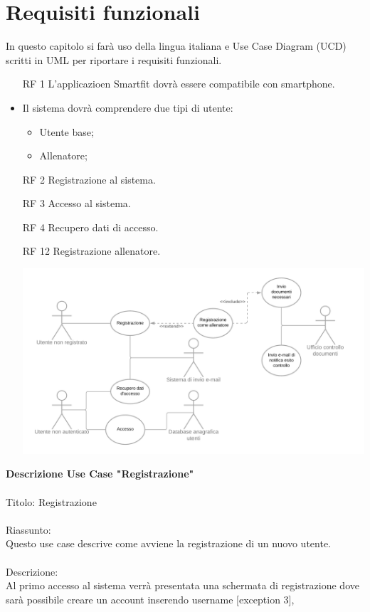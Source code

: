 \documentclass{article}
\begin{document}
\section{Requisiti funzionali}
In questo capitolo si farà uso della lingua italiana e Use Case Diagram (UCD) scritti in UML per riportare i requisiti funzionali.
\begin{itemize}
   \item[RF 1] L'applicazioen Smartfit dovrà essere compatibile con smartphone.
   \item Il sistema dovrà comprendere due tipi di utente:
   \begin{itemize}
      \item Utente base;
      \item Allenatore;
   \end{itemize}
   \item[RF 2] Registrazione al sistema.
   \item[RF 3] Accesso al sistema.
   \item[RF 4] Recupero dati di accesso.   
   \item[RF 12] Registrazione allenatore. 
   \begin{center}
      \includegraphics[width=175mm]{Utente non registrato.png}
   \end{center}
\end{itemize}
\textbf{Descrizione Use Case "Registrazione"}\\
\\
Titolo: Registrazione\\
\\
Riassunto:\\
Questo use case descrive come avviene la registrazione di un nuovo utente.\\
\\
Descrizione: \\
Al primo accesso al sistema verrà presentata una schermata di registrazione dove sarà possibile creare un account inserendo username [exception 3],
\end{document}

